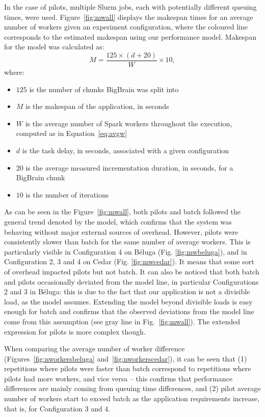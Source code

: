 \documentclass{IEEEtran}
\begin{document}
In the case of pilots, multiple Slurm jobs, each with potentially different queuing times,
were used. Figure~\ref{fig:mwall} displays the makespan times for an average number of workers
given an experiment configuration, where the coloured line corresponds to the estimated makespan using 
our performance model. Makespan for the model was calculated as:
$$
M = \frac{125\times(d + 20)}{W}\times 10,
$$
where:
\begin{itemize}
    \item $125$ is the number of chunks BigBrain was split into
    \item $M$ is the makespan of the application, in seconds
    \item $W$ is the average number of Spark workers throughout the execution, computed as in Equation~\ref{eq:avgw}
    \item $d$ is the task delay, in seconds, associated with a given configuration
    \item $20$ is the average measured incrementation duration, in seconds, for a BigBrain chunk
    \item $10$ is the number of iterations
\end{itemize}
As can be seen in the Figure~\ref{fig:mwall}, both pilots and batch 
followed the general trend denoted by the model, which confirms that 
the system was behaving without major external sources of
overhead. However, pilots were consistently slower than batch for the same
number of average workers. This is particularly visible in Configuration 4
on B\'eluga (Fig. \ref{fig:mwbeluga}), and in Configuration 2, 3 and 4 on
Cedar (Fig. \ref{fig:mwcedar}). It means that some sort of overhead
impacted pilots but not batch. It can also be noticed that both batch and
pilots occasionally deviated from the model line, in particular
Configurations 2 and 3 in B\'eluga: this is due to the fact that our
application is not a divisible load, as the model assumes. Extending the
model beyond divisible loads is easy enough for batch and confirms that the
observed deviations from the model line come from this assumption (see gray
line in Fig.~\ref{fig:mwall}). The extended expression for pilots is more complex
though.

When
comparing the average number of worker difference
(Figures~\ref{fig:nworkersbeluga} and~\ref{fig:nworkerscedar}), it can be
seen that (1) repetitions where pilots were faster than batch correspond
to repetitions where pilots had more workers, and vice versa -- this
confirms that performance differences are mainly coming from queuing time
differences, and (2) pilot average number of workers start to exceed batch
as the application requirements increase, that is, for Configuration 3 and
4.
\end{document}
